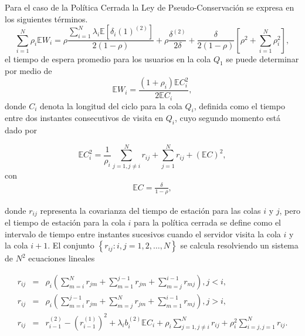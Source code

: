 \documentclass{article}
\newcommand{\esp}{\mathbb{E}}
\begin{document}
Para el caso de la Pol\'itica Cerrada la Ley de Pseudo-Conservaci\'on se expresa en los siguientes t\'erminos.
\begin{equation}\label{LPCPG}
\sum_{i=1}^{N}\rho_{i}\esp
W_{i}=\rho\frac{\sum_{i=1}^{N}\lambda_{i}\esp\left[\delta_{i}\left(1\right)^{(2)}\right]}{2\left(1-\rho\right)}+\rho\frac{\delta^{(2)}}{2\delta}+\frac{\delta}{2\left(1-\rho\right)}\left[\rho^{2}+\sum_{i=1}^{N}\rho_{i}^{2}\right],
\end{equation}
el tiempo de espera promedio para los usuarios en la cola $Q_{1}$ se puede determinar por medio de
\begin{equation}\label{Eq.Tiempo.Espera.Gated}
\esp W_{i}=\frac{\left(1+\rho_{i}\right)\esp C_{i}^{2}}{2\esp
C_{i}},
\end{equation}
donde $C_{i}$ denota la longitud del ciclo para la cola $Q_{i}$, definida como el tiempo entre dos instantes consecutivos de visita en $Q_{i}$, cuyo segundo momento est\'a dado por

\begin{equation}\label{Eq.Periodo.Intervisita.Gated}
\esp C_{i}^{2}=\frac{1}{\rho_{i}}\sum_{j=1,j\neq
i}^{N}r_{ij}+\sum_{j=1}^{N}r_{ij}+\left(\esp C\right)^{2},
\end{equation}
con
\begin{eqnarray*}
\esp C=\frac{\delta}{1-\rho},
\end{eqnarray*}

donde $r_{ij}$ representa la covarianza del tiempo de estaci\'on para las colas $i$ y $j$, pero el tiempo de estaci\'on para la cola $i$ para la pol\'itica cerrada se define como el intervalo de tiempo entre instantes sucesivos cuando el servidor visita la cola $i$ y la cola $i+1$. El conjunto $\left\{r_{ij}:i,j=1,2,\ldots,N\right\}$ se calcula resolviendo un
sistema de $N^{2}$ ecuaciones lineales

\begin{eqnarray}\label{Eq.Cov.TT.Gated}
r_{ij}&=&\rho_{i}\left(\sum_{m=i}^{N}r_{jm}+\sum_{m=1}^{j-1}r_{jm}+\sum_{m=j}^{i-1}r_{mj}\right),\textrm{
}j<i,\\
r_{ij}&=&\rho_{i}\left(\sum_{m=i}^{j-1}r_{jm}+\sum_{m=j}^{N}r_{jm}+\sum_{m=1}^{i-1}r_{mj}\right),\textrm{
}j>i,\\
r_{ij}&=&r_{i-1}^{(2)}-\left(r_{i-1}^{(1)}\right)^{2}+\lambda_{i}b_{i}^{(2)}\esp
C_{i}+\rho_{i}\sum_{j=1,j\neq
i}^{N}r_{ij}+\rho_{i}^{2}\sum_{i=j,j=1}^{N}r_{ij}.
\end{eqnarray}
\end{document}
